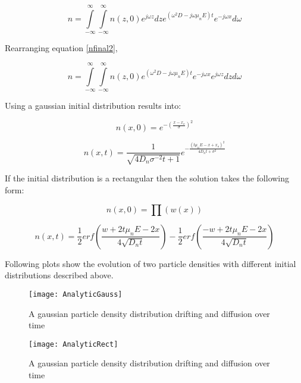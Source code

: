 \begin{equation}
n=\int\limits_{-\infty}^{\infty}\int\limits_{-\infty}^{\infty}n(z,0)e^{j\omega z}dz e^{(\omega ^2 D-j\omega \mu_n E)t}e^{-j\omega x}d\omega
\label{nfinal2}
\end{equation}

Rearranging equation \eqref{nfinal2},

\begin{equation}
n=\int\limits_{-\infty}^{\infty}\int\limits_{-\infty}^{\infty}n(z,0) e^{(\omega ^2 D-j\omega \mu_n E)t}e^{-j\omega x} e^{j\omega z}  dz d\omega
\end{equation}

Using a gaussian initial distribution results into:

\begin{equation}
n(x,0)=e^{- (\frac{x-x_o}{\sigma})^2}
\end{equation}

\begin{equation}
n(x,t)=\frac{1}{\sqrt{4D_n\sigma^{-2}t+1}}e^{-\frac{(t\mu_n E-x+x_o)^2}{4D_n t+\sigma^2}}
\end{equation}

If the initial distribution is a rectangular then the solution takes the following form:

\begin{equation}
n(x,0)=\prod (w(x))
\end{equation}

\begin{equation}
n(x,t)=\frac{1}{2} erf(\frac{w+2t \mu_n E-2x}{4\sqrt{D_n t}})-\frac{1}{2}erf(\frac{-w+2t \mu_n E-2x}{4\sqrt{D_n t}}) 
\end{equation}

Following plots show the evolution of two particle densities with different initial distributions described above.

\begin{figure}[!htp]
\centering
\texttt{[image: AnalyticGauss]}
\caption{A gaussian particle density distribution drifting and diffusion over time} 
\end{figure}

\begin{figure}[!htp]
\centering
\texttt{[image: AnalyticRect]}
\caption{A gaussian particle density distribution drifting and diffusion over time} 
\end{figure}
\clearpage
